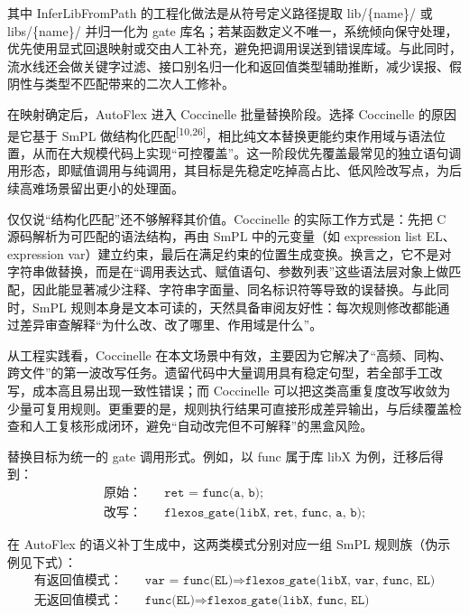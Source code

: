 \documentclass[UTF8,a4paper,12pt]{ctexart}
\numberwithin{equation}{section}
\begin{document}
其中 InferLibFromPath 的工程化做法是从符号定义路径提取 lib/\{name\}/ 或
libs/\{name\}/ 并归一化为 gate
库名；若某函数定义不唯一，系统倾向保守处理，优先使用显式回退映射或交由人工补充，避免把调用误送到错误库域。与此同时，流水线还会做关键字过滤、接口别名归一化和返回值类型辅助推断，减少误报、假阴性与类型不匹配带来的二次人工修补。

在映射确定后，AutoFlex 进入 Coccinelle 批量替换阶段。选择 Coccinelle
的原因是它基于 SmPL
做结构化匹配\textsuperscript{[10,26]}，相比纯文本替换更能约束作用域与语法位置，从而在大规模代码上实现``可控覆盖''。这一阶段优先覆盖最常见的独立语句调用形态，即赋值调用与纯调用，其目标是先稳定吃掉高占比、低风险改写点，为后续高难场景留出更小的处理面。

仅仅说``结构化匹配''还不够解释其价值。Coccinelle 的实际工作方式是：先把
C 源码解析为可匹配的语法结构，再由 SmPL 中的元变量（如 expression list
EL、expression
var）建立约束，最后在满足约束的位置生成变换。换言之，它不是对字符串做替换，而是在``调用表达式、赋值语句、参数列表''这些语法层对象上做匹配，因此能显著减少注释、字符串字面量、同名标识符等导致的误替换。与此同时，SmPL
规则本身是文本可读的，天然具备审阅友好性：每次规则修改都能通过差异审查解释``为什么改、改了哪里、作用域是什么''。

从工程实践看，Coccinelle
在本文场景中有效，主要因为它解决了``高频、同构、跨文件''的第一波改写任务。遗留代码中大量调用具有稳定句型，若全部手工改写，成本高且易出现一致性错误；而
Coccinelle
可以把这类高重复度改写收敛为少量可复用规则。更重要的是，规则执行结果可直接形成差异输出，与后续覆盖检查和人工复核形成闭环，避免``自动改完但不可解释''的黑盒风险。

替换目标为统一的 gate 调用形式。例如，以 func 属于库 libX
为例，迁移后得到：
\begin{equation}
\begin{aligned}
\text{原始：}\quad & \texttt{ret = func(a, b);} \\
\text{改写：}\quad & \texttt{flexos\_gate(libX, ret, func, a, b);} 
\end{aligned}
\end{equation}

在 AutoFlex 的语义补丁生成中，这两类模式分别对应一组 SmPL
规则族（伪示例见下式）：
\begin{equation}
\begin{aligned}
\text{有返回值模式：}\quad & \texttt{var = func(EL)} \Rightarrow \texttt{flexos\_gate(libX, var, func, EL)} \\
\text{无返回值模式：}\quad & \texttt{func(EL)} \Rightarrow \texttt{flexos\_gate(libX, func, EL)}
\end{aligned}
\end{equation}
\end{document}
